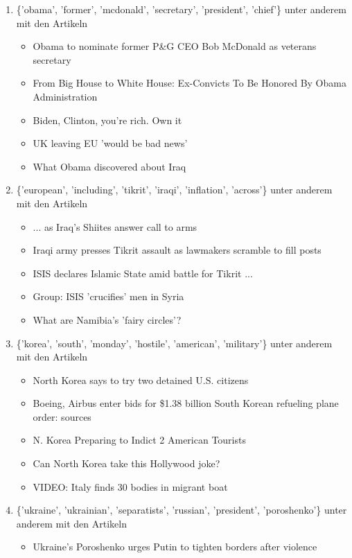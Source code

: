 \documentclass[12pt,a4paper]{scrartcl}
\begin{document}
\begin{enumerate}
\item {\{'obama', 'former', 'mcdonald', 'secretary', 'president', 'chief'\} unter anderem mit den Artikeln
	\begin{itemize}
	\item{Obama to nominate former P\&G CEO Bob McDonald as veterans secretary}
	\item{From Big House to White House: Ex-Convicts To Be Honored By Obama Administration}
	\item{Biden, Clinton, you're rich. Own it}
	\item{UK leaving EU 'would be bad news'}
	\item{What Obama discovered about Iraq}
	\end{itemize}}
\item{\{'european', 'including', 'tikrit', 'iraqi', 'inflation', 'across'\} unter anderem mit den Artikeln
	\begin{itemize}
	\item{... as Iraq's Shiites answer call to arms}
	\item{Iraqi army presses Tikrit assault as lawmakers scramble to fill posts}
	\item{ISIS declares Islamic State amid battle for Tikrit ...}
	\item{Group: ISIS 'crucifies' men in Syria}
	\item{What are Namibia's 'fairy circles'?}
	\end{itemize}}
\item{\{'korea', 'south', 'monday', 'hostile', 'american', 'military'\} unter anderem mit den Artikeln
	\begin{itemize}
	\item{North Korea says to try two detained U.S. citizens}
	\item{Boeing, Airbus enter bids for \$1.38 billion South Korean refueling plane order: sources}
	\item{N. Korea Preparing to Indict 2 American Tourists}
	\item{Can North Korea take this Hollywood joke?}
	\item{VIDEO: Italy finds 30 bodies in migrant boat}
	\end{itemize}}
\item{\{'ukraine', 'ukrainian', 'separatists', 'russian', 'president', 'poroshenko'\} unter anderem mit den Artikeln
	\begin{itemize}
	\item{Ukraine's Poroshenko urges Putin to tighten borders after violence}

\end{itemize}}
\end{enumerate}
\end{document}
